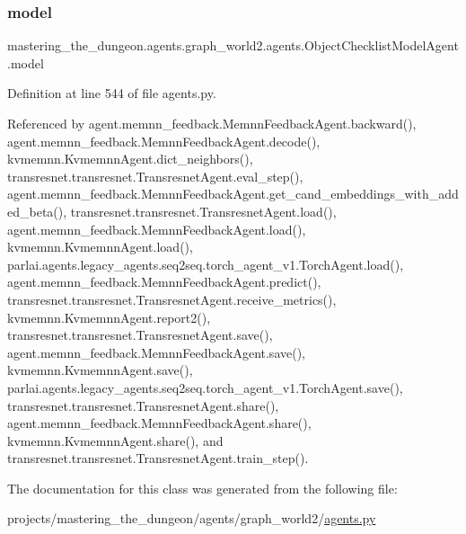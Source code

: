 \subsubsection{\texorpdfstring{model}{model}}
{\footnotesize\ttfamily mastering\+\_\+the\+\_\+dungeon.\+agents.\+graph\+\_\+world2.\+agents.\+Object\+Checklist\+Model\+Agent.\+model}



Definition at line 544 of file agents.\+py.



Referenced by agent.\+memnn\+\_\+feedback.\+Memnn\+Feedback\+Agent.\+backward(), agent.\+memnn\+\_\+feedback.\+Memnn\+Feedback\+Agent.\+decode(), kvmemnn.\+Kvmemnn\+Agent.\+dict\+\_\+neighbors(), transresnet.\+transresnet.\+Transresnet\+Agent.\+eval\+\_\+step(), agent.\+memnn\+\_\+feedback.\+Memnn\+Feedback\+Agent.\+get\+\_\+cand\+\_\+embeddings\+\_\+with\+\_\+added\+\_\+beta(), transresnet.\+transresnet.\+Transresnet\+Agent.\+load(), agent.\+memnn\+\_\+feedback.\+Memnn\+Feedback\+Agent.\+load(), kvmemnn.\+Kvmemnn\+Agent.\+load(), parlai.\+agents.\+legacy\+\_\+agents.\+seq2seq.\+torch\+\_\+agent\+\_\+v1.\+Torch\+Agent.\+load(), agent.\+memnn\+\_\+feedback.\+Memnn\+Feedback\+Agent.\+predict(), transresnet.\+transresnet.\+Transresnet\+Agent.\+receive\+\_\+metrics(), kvmemnn.\+Kvmemnn\+Agent.\+report2(), transresnet.\+transresnet.\+Transresnet\+Agent.\+save(), agent.\+memnn\+\_\+feedback.\+Memnn\+Feedback\+Agent.\+save(), kvmemnn.\+Kvmemnn\+Agent.\+save(), parlai.\+agents.\+legacy\+\_\+agents.\+seq2seq.\+torch\+\_\+agent\+\_\+v1.\+Torch\+Agent.\+save(), transresnet.\+transresnet.\+Transresnet\+Agent.\+share(), agent.\+memnn\+\_\+feedback.\+Memnn\+Feedback\+Agent.\+share(), kvmemnn.\+Kvmemnn\+Agent.\+share(), and transresnet.\+transresnet.\+Transresnet\+Agent.\+train\+\_\+step().



The documentation for this class was generated from the following file\+:\begin{DoxyCompactItemize}
\item 
projects/mastering\+\_\+the\+\_\+dungeon/agents/graph\+\_\+world2/\hyperlink{projects_2mastering__the__dungeon_2agents_2graph__world2_2agents_8py}{agents.\+py}\end{DoxyCompactItemize}
